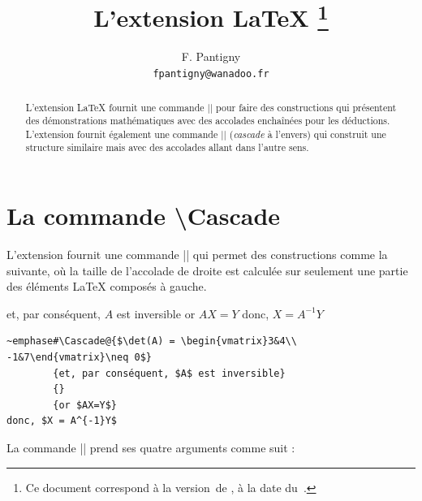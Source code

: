 \documentclass[dvipsnames]{article}%
\def\interitem{\vspace{7mm plus 2 mm minus 3mm}}
\begin{document}
\VerbatimFootnotes


\title{L'extension LaTeX \thanks{Ce document correspond à la 
version~\myfileversion\space de , à la date du~\myfiledate.}} 
\author{F. Pantigny \\ \texttt{fpantigny@wanadoo.fr}}

\maketitle

\begin{abstract}
L'extension LaTeX  fournit une commande |\Cascade| pour faire des constructions qui présentent des
démonstrations mathématiques avec des accolades enchaînées pour les déductions. L'extension  fournit
également une commande |\Edacsac| (\emph{cascade} à l'envers) qui construit une structure similaire mais avec des
accolades allant dans l'autre sens. 
\end{abstract}



\vspace{1cm}
\section{La commande \textbackslash Cascade}

L'extension  fournit une commande |\Cascade| qui permet des
constructions comme la suivante, où la taille de l'accolade de droite est
calculée sur seulement une partie des éléments LaTeX composés à gauche.
\begin{center}
        {et, par conséquent, $A$ est inversible}
        {}
        {or $AX=Y$} 
donc, $X = A^{-1}Y$
\end{center}
        
\medskip
\begin{Verbatim}
~emphase#\Cascade@{$\det(A) = \begin{vmatrix}3&4\\ -1&7\end{vmatrix}\neq 0$}
        {et, par conséquent, $A$ est inversible}
        {}
        {or $AX=Y$} 
donc, $X = A^{-1}Y$
\end{Verbatim}


\interitem
La commande |\Cascade| prend ses quatre arguments comme suit :
\begin{center}
%
{}%
{}%
{}
\end{center}
\end{document}
